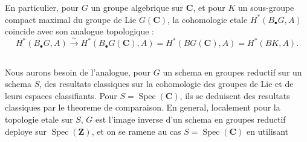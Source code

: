 \documentclass[11pt,a4paper]{article}
\theoremstyle{plain}
\theoremstyle{definition}
\DeclareMathOperator{\Spec}{Spec}
\begin{document}
En particulier, pour $G$ un groupe algebrique sur $\mathbf{C}$, et pour $K$ un sous-groupe compact maximal du groupe de Lie $G(\mathbf{C})$, la cohomologie etale $H^*(B_\bullet G, A)$ coincide avec son analogue topologique :
\begin{equation}\label{1.4.1}
H^*(B_\bullet G, A) \xrightarrow{\sim} H^*(B_\bullet G(\mathbf{C}), A) = H^*(BG(\mathbf{C}), A) = H^*(BK, A).
\end{equation}

\subsection{}\label{1.5}

Nous aurons besoin de l'analogue, pour $G$ un schema en groupes reductif sur un schema $S$, des resultats classiques sur la cohomologie des groupes de Lie et de leurs espaces classifiants. Pour $S = \Spec(\mathbf{C})$, ils se deduisent des resultats classiques par le theoreme de comparaison. En general, localement pour la topologie etale sur $S$, $G$ est l'image inverse d'un schema en groupes reductif deploye sur $\Spec(\mathbf{Z})$, et on se ramene au cas $S = \Spec(\mathbf{C})$ en utilisant
\end{document}
